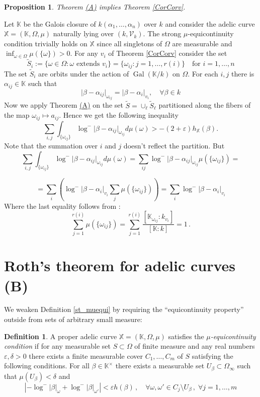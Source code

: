 \documentclass[10 pt,a4paper]{article}
\theoremstyle{plain}
\newtheorem{prop}[thm]{Proposition}
\theoremstyle{definition}
\newtheorem{defn}[thm]{Definition}
\theoremstyle{named}
\newcommand\bref[3][blue]{%
    \begingroup%
    \hypersetup{linkcolor=#1}%
    \hyperlink{#2}{#3}%
    \endgroup}
\DeclareMathOperator{\Gal}{Gal}
\begin{document}
\begin{prop}\label{im_cor}
    Theorem \bref{thm:main}{(A)} implies Theorem \ref{CorCorv}.
\end{prop}
\proof
Let $\mathbb K$  be the Galois closure of $k(\alpha_1,\ldots,\alpha_n)$ over $k$ and consider the adelic curve  $\mathbb X= (\mathbb K,\Omega, \mu)$  naturally lying over $(k,\mathcal V_k)$. The strong $\mu$-equicontinuity condition trivially holds on $\mathbb X$ since all singletons of $\Omega$ are measurable and $\inf_{\omega\in\Omega}\mu(\{\omega\})>0$. For any  $v_i$ of Theorem \ref{CorCorv} consider the set
\[
\widetilde S_i:=\{\omega\in\Omega \colon \text{$\omega$ extends $v_i$}\}=\{\omega_{ij}\colon j=1,\ldots, r(i)\}\quad \text{for $i=1,\ldots,n$}
\]
The set $\widetilde S_i$ are orbits under the action of $\Gal(\mathbb K/k)$ on $\Omega$. For each $i,j$ there is $\alpha_{ij}\in \mathbb K$ such that
\[
\vert \beta-\alpha_{ij}\vert_{\omega_{ij}}=\vert \beta-\alpha_{i}\vert_{v_i},\quad \forall\beta\in k
\]
Now we apply Theorem \bref{thm:main}{(A)} on the set $\widetilde S=\cup_\ell\widetilde S_\ell$ partitioned along the fibers of the map $\omega_{ij}\mapsto a_{ij}$. Hence we get the following inequality
\[
\sum_{i,j}\int_{\{\omega_{ij}\}}\log^-\vert \beta-\alpha_{ij}\vert_{\omega_{ij}} d\mu(\omega)>-(2+\varepsilon) h_{\mathbb X}(\beta).
\]
Note that the summation over $i$ and $j$ doesn't reflect the partition. But 
\[
\sum_{i,j}\int_{\{\omega_{ij}\}}\log^-\vert \beta-\alpha_{ij}\vert_{\omega_{ij}} d\mu(\omega)=\sum_{ij} \log^-\vert \beta-\alpha_{ij}\vert_{\omega_{ij}}\mu(\{\omega_{ij}\})=
\]

\[
=\sum_i\left(\log^-\vert \beta-\alpha_{i}\vert_{v_i}\sum_j\mu(\{\omega_{ij}\})\right)=\sum_i\log^-\vert \beta-\alpha_{i}\vert_{v_i}
\]
Where the last equality follows from \cite[Ch. II, Corollary 8.4]{Neu}:
\[
\sum^{r(i)}_{j=1}\mu(\{\omega_{ij}\})=\sum^{r(i)}_{j=1}\frac{[\mathbb K_{\omega_{ij}}\colon k_{v_i}]}{[\mathbb K\colon k]}=1\,.
\]
\endproof




\section{Roth's theorem for adelic curves (B)}\label{mainsect2}

We weaken Definition \ref{st_muequi} by requiring the ``equicontinuity property'' outside from sets of arbitrary small measure:
\begin{defn}\label{muequi}
A proper adelic curve $\mathbb X=(\mathbb K,\Omega, \mu)$ satisfies the \emph{$\mu$-equicontinuity condition} if for any measurable set $S\subset\Omega$ of finite measure and any real numbers $\varepsilon,\delta>0$ there exists a finite measurable cover $C_1,\ldots, C_m$ of $S$ satisfying the following conditions. For all $\beta\in\mathbb K^\times$ there exists a measurable set $U_\beta\subset\Omega_\infty$ such that $\mu(U_\beta)<\delta$ and
\[
\left\vert-\log^-\vert\beta\vert_{\omega}+\log^-\vert\beta\vert_{\omega'} \right\vert<\varepsilon h(\beta)\,,\quad \forall \omega,\omega'\in C_j\setminus U_\beta\,,\; \forall j=1,\ldots, m
\]
\end{defn}
\end{document}

